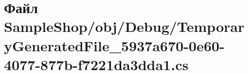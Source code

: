\hypertarget{_sample_shop_2obj_2_debug_2_temporary_generated_file__5937a670-0e60-4077-877b-f7221da3dda1_8cs}{}\section{Файл Sample\+Shop/obj/\+Debug/\+Temporary\+Generated\+File\+\_\+5937a670-\/0e60-\/4077-\/877b-\/f7221da3dda1.cs}
\label{_sample_shop_2obj_2_debug_2_temporary_generated_file__5937a670-0e60-4077-877b-f7221da3dda1_8cs}
